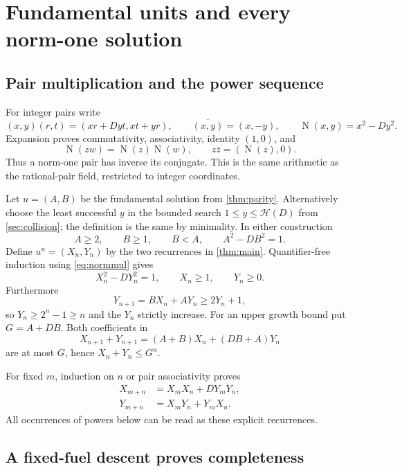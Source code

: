 \documentclass[11pt,letterpaper]{article}
\theoremstyle{definition}
\newcommand{\Nm}{\operatorname{N}}
\newcommand{\collB}{\mathcal H}
\begin{document}
\section{Fundamental units and every norm-one solution}\label{sec:units}

\subsection{Pair multiplication and the power sequence}

For integer pairs write
\[
 (x,y)(r,t)=(xr+Dyt,xt+yr),\qquad
 \overline{(x,y)}=(x,-y),\qquad
 \Nm(x,y)=x^2-Dy^2.
\]
Expansion proves commutativity, associativity, identity $(1,0)$, and
\begin{equation}\label{eq:normmul}
 \Nm(zw)=\Nm(z)\Nm(w),\qquad z\bar z=(\Nm(z),0).
\end{equation}
Thus a norm-one pair has inverse its conjugate. This is the same arithmetic
as the rational-pair field, restricted to integer coordinates.

Let $u=(A,B)$ be the fundamental solution from \cref{thm:parity}.
Alternatively choose the least successful $y$ in the bounded search
$1\le y\le\collB(D)$ from \cref{sec:collision}; the definition is the
same by minimality. In either construction
\[
 A\ge2,\qquad B\ge1,\qquad B<A,\qquad A^2-DB^2=1.
\]
Define $u^n=(X_n,Y_n)$ by the two recurrences in \cref{thm:main}.
Quantifier-free induction using \eqref{eq:normmul} gives
\begin{equation}\label{eq:powerfacts}
 X_n^2-DY_n^2=1,\qquad X_n\ge1,\qquad Y_n\ge0.
\end{equation}
Furthermore
\[
 Y_{n+1}=BX_n+AY_n\ge2Y_n+1,
\]
so $Y_n\ge2^n-1\ge n$ and the $Y_n$ strictly increase.
For an upper growth bound put $G=A+DB$. Both coefficients in
\[
 X_{n+1}+Y_{n+1}=(A+B)X_n+(DB+A)Y_n
\]
are at most $G$, hence $X_n+Y_n\le G^n$.

For fixed $m$, induction on $n$ or pair associativity proves
\begin{equation}\label{eq:addition}
\begin{aligned}
 X_{m+n}&=X_mX_n+DY_mY_n,\\
 Y_{m+n}&=X_mY_n+Y_mX_n.
\end{aligned}
\end{equation}
All occurrences of powers below can be read as these explicit recurrences.

\subsection{A fixed-fuel descent proves completeness}
\end{document}
